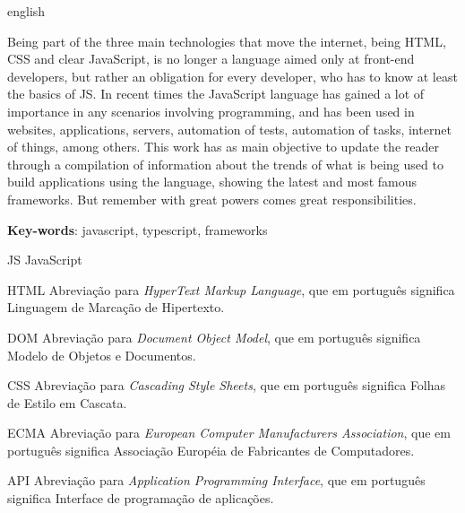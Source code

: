 \documentclass[
	12pt,				%
	openright,			%
	twoside,			%
	a4paper,			%
	english,			%
	brazil				%
	]{abntex2}
\begin{document}
\begin{resumo}[Abstract]
 \begin{otherlanguage*}{english}

Being part of the three main technologies that move the internet, being HTML, CSS and clear JavaScript, is no longer a language aimed only at front-end developers, but rather an obligation for every developer, who has to know at least the basics of JS. In recent times the JavaScript language has gained a lot of importance in any scenarios involving programming, and has been used in websites, applications, servers, automation of tests, automation of tasks, internet of things, among others. This work has as main objective to update the reader through a compilation of information about the trends of what is being used to build applications using the language, showing the latest and most famous frameworks. But remember with great powers comes great responsibilities.

   \vspace{\onelineskip}
 
   \noindent 
   \textbf{Key-words}: javascript, typescript, frameworks
 \end{otherlanguage*}
\end{resumo}
\listoffigures*
\cleardoublepage


\begin{siglas}
  \item[JS] JavaScript
  \item[HTML] Abreviação para \textit{HyperText Markup Language}, que em português significa Linguagem de Marcação de Hipertexto.
  \item[DOM] Abreviação para \textit{Document Object Model}, que em português significa Modelo de Objetos e Documentos.
  \item[CSS] Abreviação para \textit{Cascading Style Sheets}, que em português significa Folhas de Estilo em Cascata.
  \item[ECMA] Abreviação para \textit{European Computer Manufacturers Association}, que em português significa Associação Européia de Fabricantes de Computadores.
  \item[API] Abreviação para \textit{Application Programming Interface}, que em português significa Interface de programação de aplicações.
\end{siglas}
\end{document}
